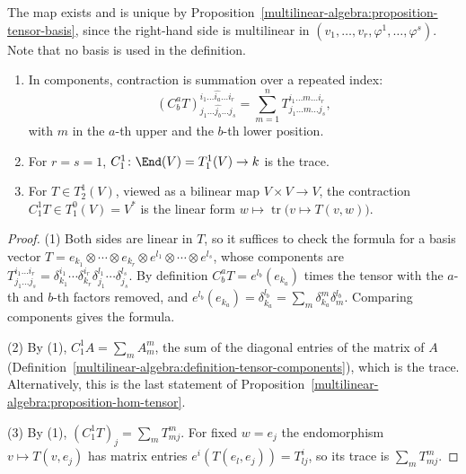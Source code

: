 The map exists and is unique by Proposition~\ref{multilinear-algebra:proposition-tensor-basis}, since the right-hand side is multilinear in $(v_1, \ldots, v_r, \varphi^1, \ldots, \varphi^s)$.
Note that no basis is used in the definition.

\begin{proposition}\label{multilinear-algebra:proposition-contraction}
\begin{enumerate}
\item In components, contraction is summation over a repeated index:
\[
(C^a_bT)^{i_1 \ldots \widehat{i_a} \ldots i_r}_{j_1 \ldots \widehat{j_b} \ldots j_s} = \sum_{m=1}^nT^{i_1 \ldots m \ldots i_r}_{j_1 \ldots m \ldots j_s},
\]
with $m$ in the $a$-th upper and the $b$-th lower position.
\item For $r = s = 1$, $C^1_1 \colon \End(V) = T^1_1(V) \to k$ is the trace.
\item For $T \in T^1_2(V)$, viewed as a bilinear map $V \times V \to V$, the contraction $C^1_1T \in T^0_1(V) = V^*$ is the linear form $w \mapsto \operatorname{tr}\bigl(v \mapsto T(v, w)\bigr)$.
\end{enumerate}
\end{proposition}

\begin{proof}
(1) Both sides are linear in $T$, so it suffices to check the formula for a basis vector $T = e_{k_1} \otimes \cdots \otimes e_{k_r} \otimes e^{l_1} \otimes \cdots \otimes e^{l_s}$, whose components are
$T^{i_1 \ldots i_r}_{j_1 \ldots j_s} = \delta^{i_1}_{k_1} \cdots \delta^{i_r}_{k_r}\delta^{l_1}_{j_1} \cdots \delta^{l_s}_{j_s}$. By definition $C^a_bT = e^{l_b}(e_{k_a})$ times the tensor with the
$a$-th and $b$-th factors removed, and $e^{l_b}(e_{k_a}) = \delta^{l_b}_{k_a} = \sum_m\delta^m_{k_a}\delta^{l_b}_m$. Comparing components gives the formula.

(2) By (1), $C^1_1A = \sum_mA^m_m$, the sum of the diagonal entries of the matrix of $A$ (Definition~\ref{multilinear-algebra:definition-tensor-components}), which is the trace. Alternatively,
this is the last statement of Proposition~\ref{multilinear-algebra:proposition-hom-tensor}.

(3) By (1), $(C^1_1T)_j = \sum_mT^m_{mj}$. For fixed $w = e_j$ the endomorphism $v \mapsto T(v, e_j)$ has matrix entries $e^i(T(e_l, e_j)) = T^i_{lj}$, so its trace is $\sum_mT^m_{mj}$.
\end{proof}

